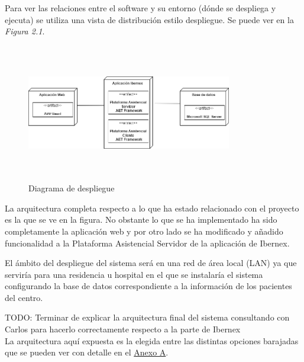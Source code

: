 

Para ver las relaciones entre el software y su entorno (dónde se despliega y ejecuta) se utiliza una vista de distribución estilo despliegue. Se puede ver en la \textit{Figura 2.1}. \newline

\begin{figure}[!h]
    \centering
    \includegraphics[width=0.8\textwidth,height=6cm]{Imagenes/Arquitectura_Sistema}
    \caption{Diagrama de despliegue}
    \label{fig:despliegue}
\end{figure}

La arquitectura completa respecto a lo que ha estado relacionado con el proyecto es la que se ve en la figura. No obstante lo que se ha implementado ha sido completamente la aplicación web y por otro lado se ha modificado y añadido funcionalidad a la Plataforma Asistencial Servidor de la aplicación de Ibernex. \newline

El ámbito del despliegue del sistema será en una red de área local (LAN) ya que serviría para una residencia u hospital en el que se instalaría el sistema configurando la base de datos correspondiente a la información de los pacientes del centro. \newline


TODO: Terminar de explicar la arquitectura final del sistema consultando con Carlos para hacerlo correctamente respecto a la parte de Ibernex\\



La arquitectura aquí expuesta es la elegida entre las distintas opciones barajadas que se pueden ver con detalle en el \hyperref[anexo-a]{Anexo A}.


